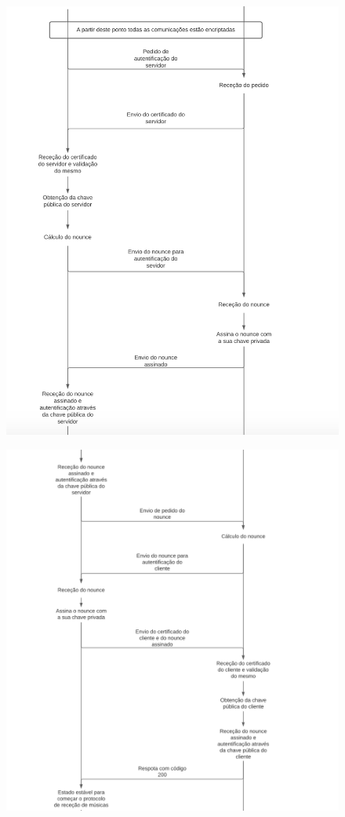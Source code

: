 \documentclass[10pt,english]{article}
\begin{document}
\begin{figure}[!h]
        \centering
        \includegraphics[width=\textwidth]{images/4.png}
\end{figure}

\begin{figure}[!h]
        \centering
        \includegraphics[width=\textwidth]{images/5.png}
\end{figure}
\end{document}
